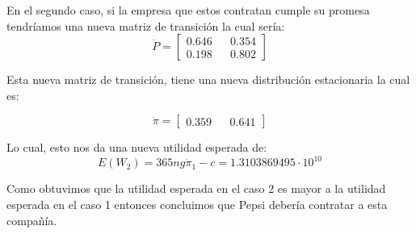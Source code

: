 \documentclass[11pt]{article}
\theoremstyle{definition}
\theoremstyle{remark}
\theoremstyle{remark}
\begin{document}
En el segundo caso, si la empresa que estos contratan cumple su
promesa tendríamos una nueva matriz de transición la cual sería:
\begin{equation}
  \label{eq:8}
  \dot{P} =
  \begin{bmatrix}
    0.646 && 0.354 \\
    0.198 && 0.802
  \end{bmatrix}
\end{equation}

Esta nueva matriz de transición, tiene una nueva distribución
estacionaria la cual es:

\begin{equation}
  \label{eq:9}
  \dot{\pi} =
  \begin{bmatrix}
    0.359 && 0.641
  \end{bmatrix}
\end{equation}

Lo cual, esto nos da una nueva utilidad esperada de:
\begin{equation}
  \label{eq:10}
  E(W_2) = 365ng \dot{\pi}_1 - c = 1.3103869495 \cdot 10^{10}
\end{equation}

Como obtuvimos que la utilidad esperada en el caso 2 es mayor a la
utilidad esperada en el caso 1 entonces concluimos que Pepsi debería
contratar a esta compañía.
\end{document}
